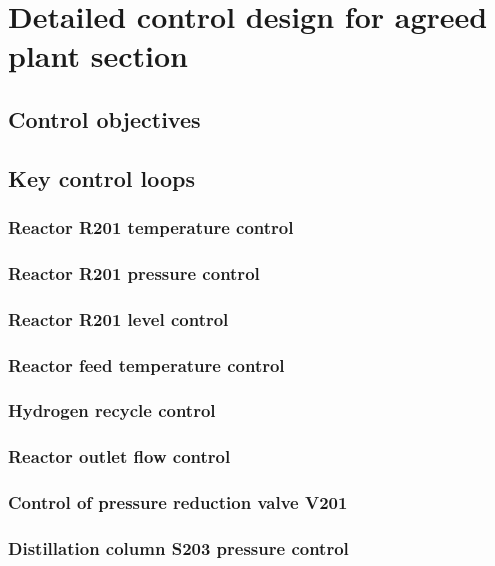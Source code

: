 \section{Detailed control design for agreed plant section}
\label{sec:subsec}

\subsection{Control objectives}

\subsection{Key control loops}

\subsubsection{Reactor R201 temperature control}

\subsubsection{Reactor R201 pressure control}

\subsubsection{Reactor R201 level control}

\subsubsection{Reactor feed temperature control}

\subsubsection{Hydrogen recycle control}

\subsubsection{Reactor outlet flow control}

\subsubsection{Control of pressure reduction valve V201}

\subsubsection{Distillation column S203 pressure control}

